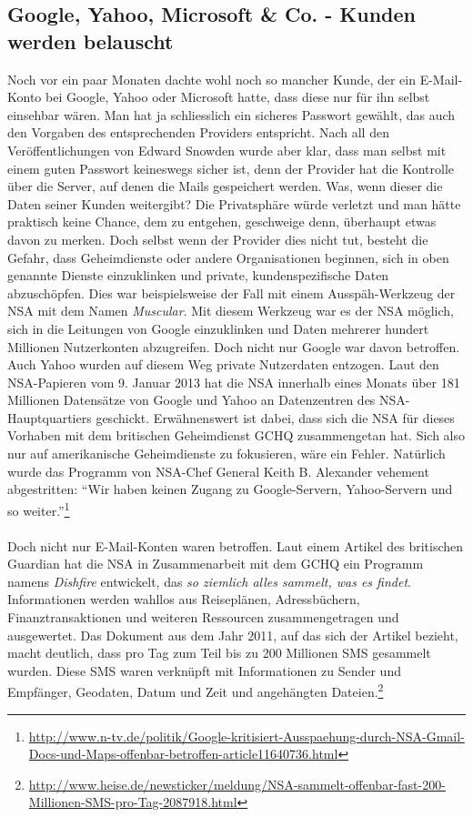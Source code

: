 \subsection{Google, Yahoo, Microsoft \& Co. - Kunden werden belauscht}
Noch vor ein paar Monaten dachte wohl noch so mancher Kunde, der ein E-Mail-Konto bei Google, Yahoo oder Microsoft hatte, dass diese nur für ihn selbst einsehbar wären. Man hat ja schliesslich ein sicheres Passwort gewählt, das auch den Vorgaben des entsprechenden Providers entspricht. Nach all den Veröffentlichungen von Edward Snowden wurde aber klar, dass man selbst mit einem guten Passwort keineswegs sicher ist, denn der Provider hat die Kontrolle über die Server, auf denen die Mails gespeichert werden. Was, wenn dieser die Daten seiner Kunden weitergibt? Die Privatsphäre würde verletzt und man hätte praktisch keine Chance, dem zu entgehen, geschweige denn, überhaupt etwas davon zu merken. Doch selbst wenn der Provider dies nicht tut, besteht die Gefahr, dass Geheimdienste oder andere Organisationen beginnen, sich in oben genannte Dienste einzuklinken und private, kundenspezifische Daten abzuschöpfen. Dies war beispielsweise der Fall mit einem Ausspäh-Werkzeug der NSA mit dem Namen \textit{Muscular}. Mit diesem Werkzeug war es der NSA möglich, sich in die Leitungen von Google einzuklinken und Daten mehrerer hundert Millionen Nutzerkonten abzugreifen. Doch nicht nur Google war davon betroffen. Auch Yahoo wurden auf diesem Weg private Nutzerdaten entzogen. Laut den NSA-Papieren vom 9. Januar 2013 hat die NSA innerhalb eines Monats über 181 Millionen Datensätze von Google und Yahoo an Datenzentren des NSA-Hauptquartiers geschickt. Erwähnenswert ist dabei, dass sich die NSA für dieses Vorhaben mit dem britischen Geheimdienst GCHQ zusammengetan hat. Sich also nur auf amerikanische Geheimdienste zu fokusieren, wäre ein Fehler. Natürlich wurde das Programm von NSA-Chef General Keith B. Alexander vehement abgestritten: ``Wir haben keinen Zugang zu Google-Servern, Yahoo-Servern und so weiter.''\footnote{\url{http://www.n-tv.de/politik/Google-kritisiert-Ausspaehung-durch-NSA-Gmail-Docs-und-Maps-offenbar-betroffen-article11640736.html}}
\\
\\
Doch nicht nur E-Mail-Konten waren betroffen. Laut einem Artikel des britischen Guardian hat die NSA in Zusammenarbeit mit dem GCHQ ein Programm namens \textit{Dishfire} entwickelt, das \textit{so ziemlich alles sammelt, was es findet}. Informationen werden wahllos aus Reiseplänen, Adressbüchern, Finanztransaktionen und weiteren Ressourcen zusammengetragen und ausgewertet. Das Dokument aus dem Jahr 2011, auf das sich der Artikel bezieht, macht deutlich, dass pro Tag zum Teil bis zu 200 Millionen SMS gesammelt wurden. Diese SMS waren verknüpft mit Informationen zu Sender und Empfänger, Geodaten, Datum und Zeit und angehängten Dateien.\footnote{\url{http://www.heise.de/newsticker/meldung/NSA-sammelt-offenbar-fast-200-Millionen-SMS-pro-Tag-2087918.html}}

